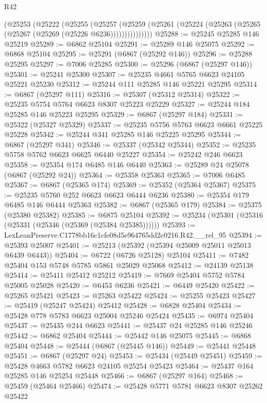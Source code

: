 \begin{lexlean}{R42}
\begin{coremodule}
{          (@25253
            (@25222
              (@25255
                (@25257
                  (@25259
                    (@25261 (@25224 (@25263 (@25265 (@25267 (@25269 (@25226 @6236)))))))))))))))
@25288 := @25245 @25285 @146 @25219
@25289 := @6862 @25104
@25291 := @25289 @146 @25075
@25292 := @6868 @25104
@25295 := @25291 (@6867 (@25292 @146))
@25296 := @25288 @25295
@25297 := @7006 @25285
@25300 := @25296 (@6867 (@25297 @146))
@25301 := @25241 @25300
@25307 := @25235 @4661 @5765 @6623 @24105 @25221 @25230
@25312 := @25244 @111 @25285 @146 @25221 @25295
@25314 := @6867 (@25297 @111)
@25316 := @25307 (@25312 @25314)
@25322 := @25235 @5754 @5764 @6623 @8307 @25223 @25229
@25327 := @25244 @184 @25285 @146 @25223 @25295
@25329 := @6867 (@25297 @184)
@25331 := @25322 (@25327 @25329)
@25337 := @25235 @5756 @5763 @6623 @6661 @25225 @25228
@25342 := @25244 @341 @25285 @146 @25225 @25295
@25344 := @6867 (@25297 @341)
@25346 := @25337 (@25342 @25344)
@25352 := @25235 @5758 @5762 @6623 @6625 @6440 @25227
@25354 := @25242 @246 @6623
@25358 := @25354 @174 @6485 @146 @6440
@25363 := @25289 @24 @25078 (@6867 (@25292 @24))
@25364 := @25358 @25363
@25365 := @7006 @6485
@25367 := @6867 (@25365 @174)
@25369 := @25352 (@25364 @25367)
@25375 := @25235 @5760 @252 @6623 @6623 @6444 @6236
@25380 := @25354 @179 @6485 @146 @6444 @25363
@25382 := @6867 (@25365 @179)
@25384 := @25375 (@25380 @25382)
@25385 := @6875 @25104
@25392 := @25234 (@25301 (@25316 (@25331 (@25346 (@25369 (@25384 @25385))))))
@25393 := LexLeanPreserve.C1778bb16c1cfe08d5e964765dd2c0216.R42.__rel_95
@25394 := @25393 @25007
@25401 := @25213 (@25392 (@25394 @25009 @25011 @25013 @6439 @6443))
@25404 := @6722 (@6726 @25128) @25104
@25411 := @7482 @25404 @153 @5748 @5785 @5861 @25029 @25068
@25412 := @24139 @25138
@25414 := @25411 @25412 @25212
@25419 := @7669 @25404 @5752 @5784 @25005 @25028
@25420 := @6453 @6236
@25421 := @6449 @25420
@25422 := @25265 @25421
@25423 := @25263 @25422
@25424 := @25255 @25423
@25427 := @25419 (@25247 @25424) @25412
@25428 := @6828 @25404
@25434 := @25428 @778 @5783 @6623 @25004 @25246 @25424
@25435 := @6974 @25404
@25437 := @25435 @244 @6623
@25441 := @25437 @24 @25285 @146 @25246
@25442 := @6862 @25404
@25444 := @25442 @146 @25075
@25445 := @6868 @25404
@25448 := @25444 (@6867 (@25445 @146))
@25449 := @25441 @25448
@25451 := @6867 (@25297 @24)
@25453 := @25434 (@25449 @25451)
@25459 := @25428 @4663 @5782 @6623 @24105 @25254 @25423
@25464 := @25437 @164 @25285 @146 @25254 @25448
@25466 := @6867 (@25297 @164)
@25468 := @25459 (@25464 @25466)
@25474 := @25428 @5771 @5781 @6623 @8307 @25262 @25422
}
\end{coremodule}
\end{lexlean}
